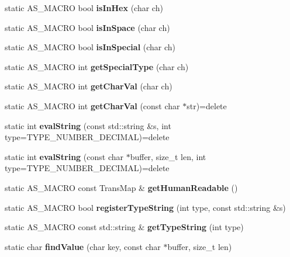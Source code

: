 \begin{DoxyCompactItemize}
static A\+S\+\_\+\+M\+A\+C\+RO bool {\bfseries is\+In\+Hex} (char ch)
\item 
\mbox{\label{classx2_1_1_lexical_parser_a21b917a42d6b2b0d78c4b352c15c613a}} 
static A\+S\+\_\+\+M\+A\+C\+RO bool {\bfseries is\+In\+Space} (char ch)
\item 
\mbox{\label{classx2_1_1_lexical_parser_a48591265bb5f4e634836004dd6ad676b}} 
static A\+S\+\_\+\+M\+A\+C\+RO bool {\bfseries is\+In\+Special} (char ch)
\item 
\mbox{\label{classx2_1_1_lexical_parser_a3014eaa73730e85c02e927c4485a0a68}} 
static A\+S\+\_\+\+M\+A\+C\+RO int {\bfseries get\+Special\+Type} (char ch)
\item 
\mbox{\label{classx2_1_1_lexical_parser_ac7526de6db8cfdda58be67b824add45e}} 
static A\+S\+\_\+\+M\+A\+C\+RO int {\bfseries get\+Char\+Val} (char ch)
\item 
\mbox{\label{classx2_1_1_lexical_parser_a21f8b212b6564855027f8cf9dd854865}} 
static A\+S\+\_\+\+M\+A\+C\+RO int {\bfseries get\+Char\+Val} (const char $\ast$str)=delete
\item 
\mbox{\label{classx2_1_1_lexical_parser_a46d98ddbba0efcabf89b41d4aab6a6b3}} 
static int {\bfseries eval\+String} (const std\+::string \&s, int type=T\+Y\+P\+E\+\_\+\+N\+U\+M\+B\+E\+R\+\_\+\+D\+E\+C\+I\+M\+AL)=delete
\item 
\mbox{\label{classx2_1_1_lexical_parser_a27e165dff3124bf6015be17b7867af82}} 
static int {\bfseries eval\+String} (const char $\ast$buffer, size\+\_\+t len, int type=T\+Y\+P\+E\+\_\+\+N\+U\+M\+B\+E\+R\+\_\+\+D\+E\+C\+I\+M\+AL)=delete
\item 
\mbox{\label{classx2_1_1_lexical_parser_a71ee68324ef9653396de116d27fe1668}} 
static A\+S\+\_\+\+M\+A\+C\+RO const Trans\+Map \& {\bfseries get\+Human\+Readable} ()
\item 
\mbox{\label{classx2_1_1_lexical_parser_a90afc8ede198df40426d1ffa0b35b44c}} 
static A\+S\+\_\+\+M\+A\+C\+RO bool {\bfseries register\+Type\+String} (int type, const std\+::string \&s)
\item 
\mbox{\label{classx2_1_1_lexical_parser_a3e83cdbdab47e6d58d19e3b43cd4da10}} 
static A\+S\+\_\+\+M\+A\+C\+RO const std\+::string \& {\bfseries get\+Type\+String} (int type)
\item 
\mbox{\label{classx2_1_1_lexical_parser_a08b01efd66c599dd753673852ad21b89}} 
static char {\bfseries find\+Value} (char key, const char $\ast$buffer, size\+\_\+t len)
\end{DoxyCompactItemize}
